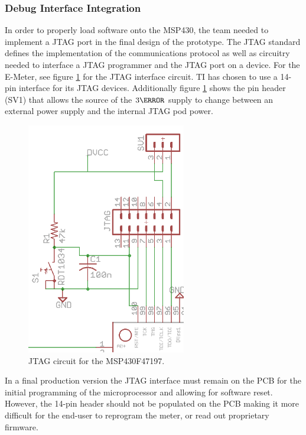 \subsubsection{Debug Interface Integration}
In order to properly load software onto the MSP430, the team needed to implement a \ac{JTAG} port in the final design of the prototype. The \ac{JTAG} standard defines the implementation of the communications protocol as well as circuitry needed to interface a \ac{JTAG} programmer and the \ac{JTAG} port on a device. For the E-Meter, see figure \ref{fig:jtag_circuit} for the \ac{JTAG} interface circuit. \ac{TI} has chosen to use a 14-pin interface for its \ac{JTAG} devices. Additionally figure \ref{fig:jtag_circuit} shows the pin header (SV1) that allows the source of the $3\volt$ supply to change between an external power supply and the internal \ac{JTAG} pod power.
\begin{figure}[htbp]
\begin{center}
\includegraphics[height=4in]{includes/JTAG_Circuit}
\caption{\ac{JTAG} circuit for the MSP430F47197.}
\label{fig:jtag_circuit}
\end{center}
\end{figure}
In a final production version the \ac{JTAG} interface must remain on the \ac{PCB} for the initial programming of the microprocessor and allowing for software reset. However, the 14-pin header should not be populated on the \ac{PCB} making it more difficult for the end-user to reprogram the meter, or read out proprietary firmware.

